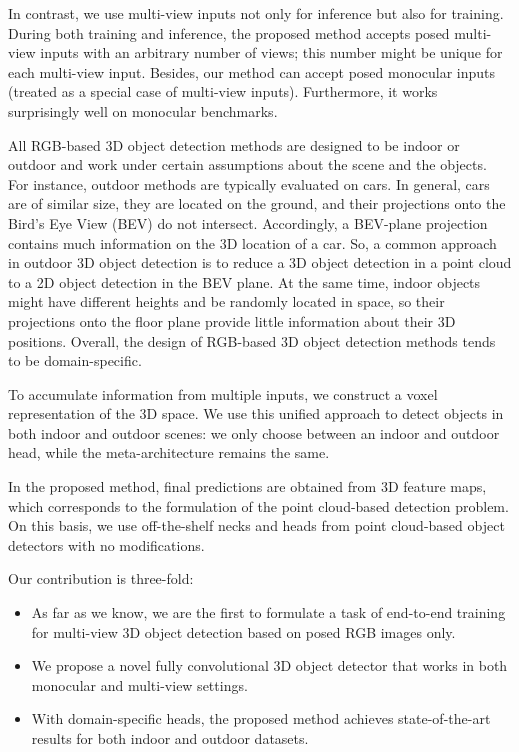 \documentclass[10pt,twocolumn,letterpaper]{article}
\begin{document}
In contrast, we use multi-view inputs not only for inference but also for training. During both training and inference, the proposed method accepts posed multi-view inputs with an arbitrary number of views; this number might be unique for each multi-view input. Besides, our method can accept posed monocular inputs (treated as a special case of multi-view inputs). Furthermore, it works surprisingly well on monocular benchmarks.

All RGB-based 3D object detection methods are designed to be indoor or outdoor and work under certain assumptions about the scene and the objects. For instance, outdoor methods are typically evaluated on cars. In general, cars are of similar size, they are located on the ground, and their projections onto the Bird's Eye View (BEV) do not intersect. Accordingly, a BEV-plane projection contains much information on the 3D location of a car. So, a common approach in outdoor 3D object detection is to reduce a 3D object detection in a point cloud to a 2D object detection in the BEV plane. At the same time, indoor objects might have different heights and be randomly located in space, so their projections onto the floor plane provide little information about their 3D positions. Overall, the design of RGB-based 3D object detection methods tends to be domain-specific. 

To accumulate information from multiple inputs, we construct a voxel representation of the 3D space. We use this unified approach to detect objects in both indoor and outdoor scenes: we only choose between an indoor and outdoor head, while the meta-architecture remains the same.

In the proposed method, final predictions are obtained from 3D feature maps, which corresponds to the formulation of the point cloud-based detection problem. On this basis, we use off-the-shelf necks and heads from point cloud-based object detectors with no modifications. 

Our contribution is three-fold:
\begin{itemize}
    \item As far as we know, we are the first to formulate a task of end-to-end training for multi-view 3D object detection based on posed RGB images only.
    \item We propose a novel fully convolutional 3D object detector that works in both monocular and multi-view settings.
    \item With domain-specific heads, the proposed method achieves state-of-the-art results for both indoor and outdoor datasets.
\end{itemize}
\end{document}

